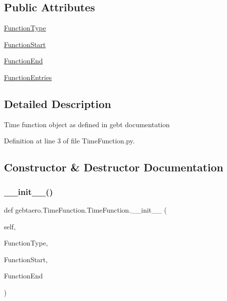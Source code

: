 \subsection*{Public Attributes}
\begin{DoxyCompactItemize}
\item 
\hyperlink{classgebtaero_1_1_time_function_1_1_time_function_a71eb6968c49304736305aee5c1e37d51}{Function\+Type}
\item 
\hyperlink{classgebtaero_1_1_time_function_1_1_time_function_acd9020ddfc729ecc704fa0c246c2e903}{Function\+Start}
\item 
\hyperlink{classgebtaero_1_1_time_function_1_1_time_function_a21c1d719341196b82dd2def3400dd832}{Function\+End}
\item 
\hyperlink{classgebtaero_1_1_time_function_1_1_time_function_a4c6508caae8928d320b70e8ecd0ce27f}{Function\+Entries}
\end{DoxyCompactItemize}


\subsection{Detailed Description}
\begin{DoxyVerb}Time function object as defined in gebt documentation
\end{DoxyVerb}
 

Definition at line 3 of file Time\+Function.\+py.



\subsection{Constructor \& Destructor Documentation}
\mbox{\label{classgebtaero_1_1_time_function_1_1_time_function_a5f3a6ae6418be0f44d7a549af4a3f339}} 
\subsubsection{\texorpdfstring{\+\_\+\+\_\+init\+\_\+\+\_\+()}{\_\_init\_\_()}}
{\footnotesize\ttfamily def gebtaero.\+Time\+Function.\+Time\+Function.\+\_\+\+\_\+init\+\_\+\+\_\+ (\begin{DoxyParamCaption}\item[{}]{self,  }\item[{}]{Function\+Type,  }\item[{}]{Function\+Start,  }\item[{}]{Function\+End }\end{DoxyParamCaption})}




